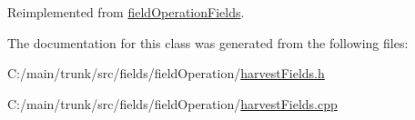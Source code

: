 Reimplemented from \hyperlink{classfield_operation_fields_a24dfd201a1faafc49dab9678977b12e3}{fieldOperationFields}.

The documentation for this class was generated from the following files:\begin{DoxyCompactItemize}
\item 
C:/main/trunk/src/fields/fieldOperation/\hyperlink{harvest_fields_8h}{harvestFields.h}\item 
C:/main/trunk/src/fields/fieldOperation/\hyperlink{harvest_fields_8cpp}{harvestFields.cpp}\end{DoxyCompactItemize}
